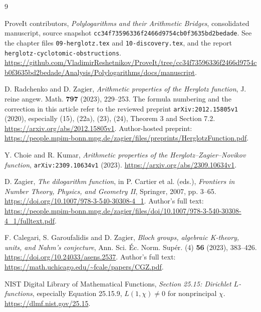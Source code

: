 \documentclass[11pt]{article}
\numberwithin{equation}{section}
\theoremstyle{definition}
\theoremstyle{remark}
\begin{document}
\clearpage
{}
{}
\begin{thebibliography}{9}

ProveIt contributors,
\emph{Polylogarithms and their Arithmetic Bridges},
consolidated manuscript, source snapshot
\texttt{cc34f73596336f2466d9754cb0f3635bd2bedade}.
See the chapter files \nolinkurl{09-herglotz.tex} and
\nolinkurl{10-discovery.tex}, and the report
\nolinkurl{herglotz-cyclotomic-obstructions}.
\url{https://github.com/VladimirReshetnikov/ProveIt/tree/cc34f73596336f2466d9754cb0f3635bd2bedade/Analysis/Polylogarithms/docs/manuscript}.

D. Radchenko and D. Zagier,
\emph{Arithmetic properties of the Herglotz function},
J. reine angew. Math. \textbf{797} (2023), 229--253.
The formula numbering and the correction in this article refer to the
reviewed preprint \texttt{arXiv:2012.15805v1} (2020), especially
(15), (22a), (23), (24), Theorem 3 and Section 7.2.
\url{https://arxiv.org/abs/2012.15805v1}.
Author-hosted preprint:
\url{https://people.mpim-bonn.mpg.de/zagier/files/preprints/HerglotzFunction.pdf}.

Y. Choie and R. Kumar,
\emph{Arithmetic properties of the Herglotz--Zagier--Novikov function},
\texttt{arXiv:2309.10634v1} (2023).
\url{https://arxiv.org/abs/2309.10634v1}.

D. Zagier,
\emph{The dilogarithm function}, in
P. Cartier et al. (eds.), \emph{Frontiers in Number Theory, Physics, and
Geometry II}, Springer, 2007, pp. 3--65.
\url{https://doi.org/10.1007/978-3-540-30308-4_1}.
Author's full text:
\url{https://people.mpim-bonn.mpg.de/zagier/files/doi/10.1007/978-3-540-30308-4_1/fulltext.pdf}.

F. Calegari, S. Garoufalidis and D. Zagier,
\emph{Bloch groups, algebraic K-theory, units, and Nahm's conjecture},
Ann. Sci. \'Ec. Norm. Sup\'er. (4) \textbf{56} (2023), 383--426.
\url{https://doi.org/10.24033/asens.2537}.
Author's full text: \url{https://math.uchicago.edu/~fcale/papers/CGZ.pdf}.

NIST Digital Library of Mathematical Functions,
\emph{Section 25.15: Dirichlet $L$-functions},
especially Equation 25.15.9, $L(1,\chi)\ne0$ for nonprincipal $\chi$.
\url{https://dlmf.nist.gov/25.15}.

\end{thebibliography}

\end{document}
